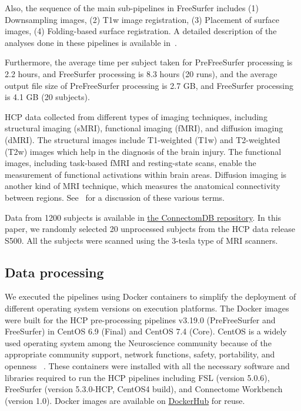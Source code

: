 \documentclass[a4paper,num-refs]{oup-contemporary}
\begin{document}
Also, the sequence of the main sub-pipelines in FreeSurfer includes 
(1) Downsampling images, 
(2) T1w image registration, 
(3) Placement of surface images, 
(4) Folding-based surface registration.
A detailed description of the analyses done in these
pipelines is available in~\cite{glasser2013}. 

Furthermore, the average time per subject taken for PreFreeSurfer processing is 2.2 hours, 
and FreeSurfer processing is 8.3 hours (20 runs), 
and the average output file size of PreFreeSurfer processing is 2.7 GB, 
and FreeSurfer processing is 4.1 GB (20 subjects).

HCP data collected from different types of imaging techniques, including 
structural imaging (sMRI), functional imaging (fMRI), and diffusion imaging (dMRI).
The structural images include T1-weighted (T1w) and T2-weighted (T2w) images which 
help in the diagnosis of the brain injury.
The functional images, including task-based fMRI and resting-state scans, 
enable the measurement of functional activations within brain areas. 
Diffusion imaging is another kind of MRI technique, which measures 
the anatomical connectivity between regions.
See~\cite{van2013wu} for a discussion of these various terms.

Data from 1200 subjects 
is available in \href{https://db.humanconnectome.org}{the ConnectomDB repository}. 
In this paper, we randomly selected 20 unprocessed subjects from 
the HCP data release S500. All the subjects were scanned using the 3-tesla 
type of MRI scanners.


\subsection{Data processing}

We executed the pipelines using Docker containers to simplify the 
deployment of different operating system versions on execution 
platforms. 
The Docker images were built for the HCP pre-processing 
pipelines v3.19.0 (PreFreeSurfer and FreeSurfer) in 
CentOS 6.9 (Final) and CentOS 7.4 (Core). 
CentOS is a widely used operating system among the Neuroscience community because of 
the appropriate community support, network functions, safety, portability, and openness
~\cite{hanke2011neuroscience}.
These containers were installed with all the necessary software and libraries 
required to run the HCP pipelines including FSL (version 5.0.6), 
FreeSurfer (version 5.3.0-HCP, CentOS4 build), and Connectome Workbench (version 1.0).
Docker images are available on 
\href{https://hub.docker.com/r/bigdatalabteam/hcp-prefreesurfer/}{DockerHub}
for reuse.
\end{document}
